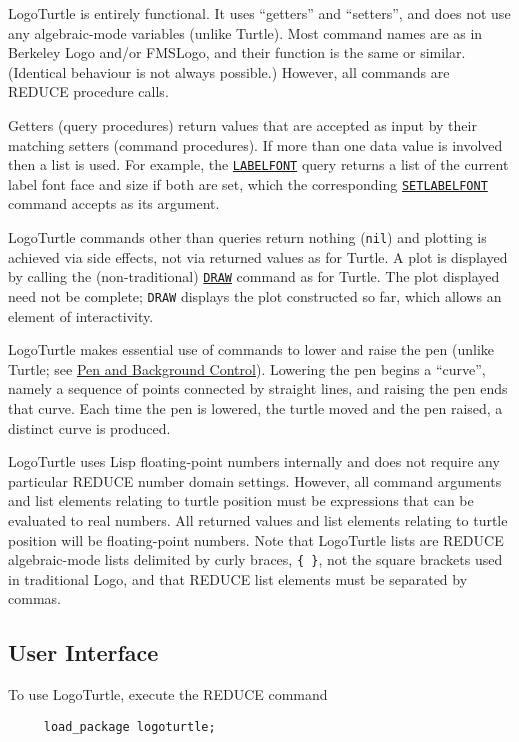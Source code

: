 LogoTurtle is entirely functional.  It uses ``getters'' and
``setters'', and does not use any algebraic-mode variables (unlike
Turtle).  Most command names are as in Berkeley Logo and/or FMSLogo,
and their function is the same or similar.  (Identical behaviour is
not always possible.)  However, all commands are REDUCE procedure
calls.

Getters (query procedures) return values that are accepted as input by
their matching setters (command procedures).  If more than one data
value is involved then a list is used.  For example, the
\hyperlink{logoturtle:labelfont}{\texttt{LABELFONT}} query returns a
list of the current label font face and size if both are set, which
the corresponding
\hyperlink{logoturtle:setlabelfont}{\texttt{SETLABELFONT}} command
accepts as its argument.

LogoTurtle commands other than queries return nothing (\texttt{nil})
and plotting is achieved via side effects, not via returned values as
for Turtle.  A plot is displayed by calling the (non-traditional)
\hyperlink{logoturtle:draw}{\texttt{DRAW}} command as for Turtle.  The
plot displayed need not be complete; \texttt{DRAW} displays the plot
constructed so far, which allows an element of interactivity.

LogoTurtle makes essential use of commands to lower and raise the pen
(unlike Turtle; see \hyperref[logoturtle:PBC]{Pen and Background
  Control}).  Lowering the pen begins a ``curve'', namely a sequence
of points connected by straight lines, and raising the pen ends that
curve.  Each time the pen is lowered, the turtle moved and the pen
raised, a distinct curve is produced.

LogoTurtle uses Lisp floating-point numbers internally and does not
require any particular REDUCE number domain settings.  However, all
command arguments and list elements relating to turtle position must
be expressions that can be evaluated to real numbers.  All returned
values and list elements relating to turtle position will be
floating-point numbers.  Note that LogoTurtle lists are REDUCE
algebraic-mode lists delimited by curly braces, \texttt{\{~\}}, not
the square brackets used in traditional Logo, and that REDUCE list
elements must be separated by commas.


\subsection{User Interface}

To use LogoTurtle, execute the REDUCE command
\begin{verbatim}
     load_package logoturtle;
\end{verbatim}

